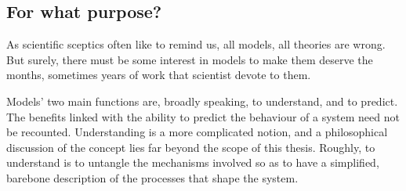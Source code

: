 \subsection{For what purpose?}
\label{sub:why_bother_}

As scientific sceptics often like to remind us, all models, all theories are
wrong. But surely, there must be some interest in models to make them deserve
the months, sometimes years of work that scientist devote to them. 

Models' two main functions are, broadly speaking, to understand, and to predict.
The benefits linked with the ability to predict the behaviour of a system need
not be recounted. Understanding is a more complicated notion, and a
philosophical discussion of the concept lies far beyond the scope of this
thesis. Roughly, to understand is to untangle the mechanisms involved so as to have a
simplified, barebone description of the processes that shape the system.\\


